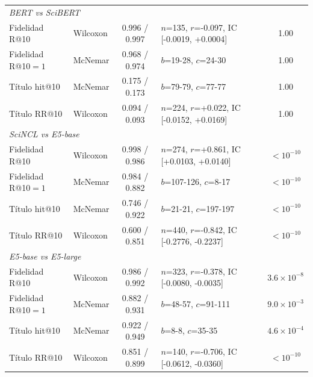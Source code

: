 \begin{table}[tbp]
\begin{tabular}{|l|l|c|l|c|}
\multicolumn{5}{|l|}{\textit{BERT vs SciBERT}} \\
Fidelidad R@10 & Wilcoxon & 0.996 / 0.997 & $n$=135, $r$=-0.097, IC [-0.0019, +0.0004] & 1.00 \\
Fidelidad R@10$=1$ & McNemar & 0.968 / 0.974 & $b$=19-28, $c$=24-30 & 1.00 \\
Título hit@10 & McNemar & 0.175 / 0.173 & $b$=79-79, $c$=77-77 & 1.00 \\
Título RR@10 & Wilcoxon & 0.094 / 0.093 & $n$=224, $r$=+0.022, IC [-0.0152, +0.0169] & 1.00 \\
\multicolumn{5}{|l|}{\textit{SciNCL vs E5-base}} \\
Fidelidad R@10 & Wilcoxon & 0.998 / 0.986 & $n$=274, $r$=+0.861, IC [+0.0103, +0.0140] & $<10^{-10}$ \\
Fidelidad R@10$=1$ & McNemar & 0.984 / 0.882 & $b$=107-126, $c$=8-17 & $<10^{-10}$ \\
Título hit@10 & McNemar & 0.746 / 0.922 & $b$=21-21, $c$=197-197 & $<10^{-10}$ \\
Título RR@10 & Wilcoxon & 0.600 / 0.851 & $n$=440, $r$=-0.842, IC [-0.2776, -0.2237] & $<10^{-10}$ \\
\multicolumn{5}{|l|}{\textit{E5-base vs E5-large}} \\
Fidelidad R@10 & Wilcoxon & 0.986 / 0.992 & $n$=323, $r$=-0.378, IC [-0.0080, -0.0035] & $3.6\times10^{-8}$ \\
Fidelidad R@10$=1$ & McNemar & 0.882 / 0.931 & $b$=48-57, $c$=91-111 & $9.0\times10^{-3}$ \\
Título hit@10 & McNemar & 0.922 / 0.949 & $b$=8-8, $c$=35-35 & $4.6\times10^{-4}$ \\
Título RR@10 & Wilcoxon & 0.851 / 0.899 & $n$=140, $r$=-0.706, IC [-0.0612, -0.0360] & $<10^{-10}$ \\
\hline
\end{tabular}
\end{table}